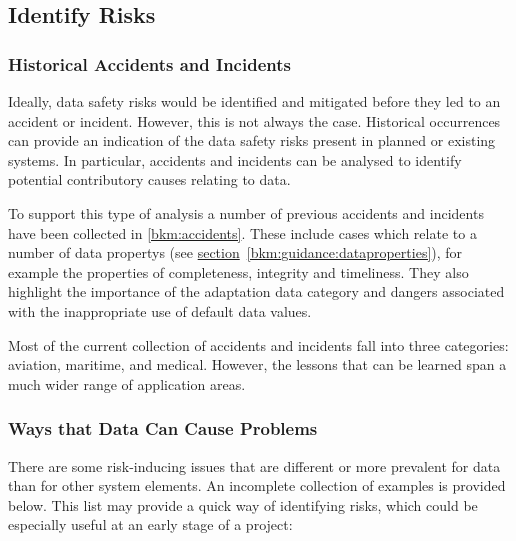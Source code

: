 \subsection{Identify Risks}
\subsubsection{Historical Accidents and Incidents}
Ideally, data safety risks would be identified and mitigated before they led to an accident or incident. However, this is not always the case. Historical occurrences can provide an indication of the data safety risks present in planned or existing systems. In particular, accidents and incidents can be analysed to identify potential contributory causes relating to data.

To support this type of analysis a number of previous accidents and incidents have been collected in \autoref{bkm:accidents}.
These include cases which relate to a number of \glspl{data property} (see
\hyperref[bkm:guidance:dataproperties]{section}~\ref{bkm:guidance:dataproperties}), %
for example the properties of \gls{completeness}, \gls{integrity} and \gls{timeliness}.
They also highlight the importance of the \gls{adaptation data} category and dangers associated with the inappropriate use of default data values.

Most of the current collection of accidents and incidents fall into three categories: aviation, maritime, and medical. However, the lessons that can be learned span a much wider range of application areas.

\subsubsection{Ways that Data Can Cause Problems}
\label{tab:issues}
There are some risk-inducing issues that are different or more prevalent for data than for other system elements. An incomplete collection of examples is provided below. This list may provide a quick way of identifying risks, which could be especially useful at an early stage of a project:


